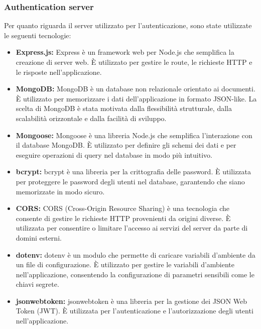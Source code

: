 \subsubsection{Authentication server}

Per quanto riguarda il server utilizzato per l'autenticazione, sono state utilizzate le seguenti tecnologie:

\begin{itemize}
      \item \textbf{Express.js:} Express è un framework web per Node.js che semplifica la creazione di server web. È utilizzato per gestire le route, le richieste HTTP e le risposte nell'applicazione.

      \item \textbf{MongoDB:} MongoDB è un database non relazionale orientato ai documenti. È utilizzato per memorizzare i dati dell'applicazione in formato JSON-like. La scelta di MongoDB è stata motivata dalla flessibilità strutturale, dalla scalabilità orizzontale e dalla facilità di sviluppo.

      \item \textbf{Mongoose:} Mongoose è una libreria Node.js che semplifica l'interazione con il database MongoDB. È utilizzato per definire gli schemi dei dati e per eseguire operazioni di query nel database in modo più intuitivo.

      \item \textbf{bcrypt:} bcrypt è una libreria per la crittografia delle password. È utilizzata per proteggere le password degli utenti nel database, garantendo che siano memorizzate in modo sicuro.

      \item \textbf{CORS:} CORS (Cross-Origin Resource Sharing) è una tecnologia che consente di gestire le richieste HTTP provenienti da origini diverse. È utilizzata per consentire o limitare l'accesso ai servizi del server da parte di domini esterni.

      \item \textbf{dotenv:} dotenv è un modulo che permette di caricare variabili d'ambiente da un file di configurazione. È utilizzato per gestire le variabili d'ambiente nell'applicazione, consentendo la configurazione di parametri sensibili come le chiavi segrete.

      \item \textbf{jsonwebtoken:} jsonwebtoken è una libreria per la gestione dei JSON Web Token (JWT). È utilizzata per l'autenticazione e l'autorizzazione degli utenti nell'applicazione.
\end{itemize}

